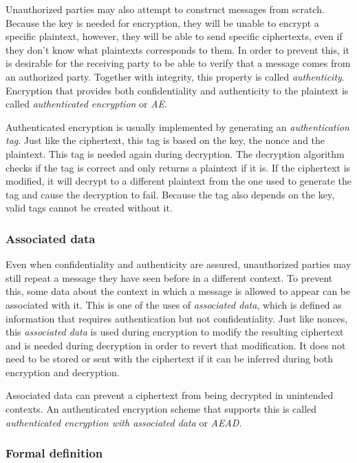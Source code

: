 Unauthorized parties may also attempt to construct messages from scratch.
Because the key is needed for encryption, they will be unable to encrypt a
specific plaintext, however, they will be able to send specific ciphertexts,
even if they don't know what plaintexts corresponds to them. In order to prevent
this, it is desirable for the receiving party to be able to verify that a
message comes from an authorized party. Together with integrity, this property
is called \emph{authenticity}. Encryption that provides both confidentiality and
authenticity to the plaintext is called \emph{authenticated encryption} or
\emph{AE}.

Authenticated encryption is usually implemented by generating an
\emph{authentication tag}. Just like the ciphertext, this tag is based on the
key, the nonce and the plaintext. This tag is needed again during decryption.
The decryption algorithm checks if the tag is correct and only returns a
plaintext if it is. If the ciphertext is modified, it will decrypt to a
different plaintext from the one used to generate the tag and cause the
decryption to fail. Because the tag also depends on the key, valid tags cannot
be created without it.

\subsubsection{Associated data}

Even when confidentiality and authenticity are assured, unauthorized parties may
still repeat a message they have seen before in a different context. To prevent
this, some data about the context in which a message is allowed to appear can be
associated with it. This is one of the uses of \emph{associated data}, which is
defined as information that requires authentication but not confidentiality.
Just like nonces, this \emph{associated data} is used during encryption to
modify the resulting ciphertext and is needed during decryption in order to
revert that modification. It does not need to be stored or sent with the
ciphertext if it can be inferred during both encryption and decryption.

Associated data can prevent a ciphertext from being decrypted in unintended
contexts. An authenticated encryption scheme that supports this is called
\emph{authenticated encryption with associated data} or \emph{AEAD}.

\subsubsection{Formal definition}

